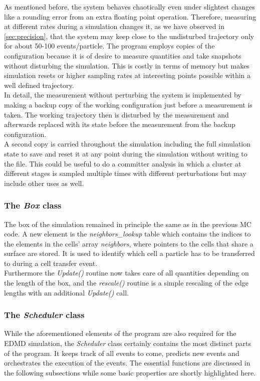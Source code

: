 As mentioned before, the system behaves chaotically even under slightest changes like a rounding error from an extra floating point operation. Therefore, measuring at different rates during a simulation changes it, as we have observed in \autoref{sec:precision}, that the system may keep close to the undisturbed trajectory only for about 50-100 events/particle. The program employs copies of the configuration because it is of desire to measure quantities and take snapshots without disturbing the simulation. This is costly in terms of memory but makes simulation resets or higher sampling rates at interesting points possible within a well defined trajectory.\\ 

In detail, the measurement without perturbing the system is implemented by making a backup copy of the working configuration just before a measurement is taken. The working trajectory then is disturbed by the measurement and afterwards replaced with its state before the measurement from the backup configuration.\\
A second copy is carried throughout the simulation including the full simulation state to save and reset it at any point during the simulation without writing to the file. This could be useful to do a committer analysis in which a cluster at different stages is sampled multiple times with different perturbations but may include other uses as well.

\subsubsection{The \textit{Box} class}
\label{sec:box_class}
The box of the simulation remained in principle the same as in the previous MC code. A new element is the \textit{neighbors\_lookup} table which contains the indices to the elements in the cells' array \textit{neighbors}, where pointers to the cells that share a surface are stored. It is used to identify which cell a particle has to be transferred to during a cell transfer event.\\

Furthermore the \textit{Update()} routine now takes care of all quantities depending on the length of the box, and the \textit{rescale()} routine is a simple rescaling of the edge lengths with an additional \textit{Update()} call.

\subsubsection{The \textit{Scheduler} class}
\label{sec:scheduler_class}
While the aforementioned elements of the program are also required for the EDMD simulation, the \textit{Scheduler} class certainly contains the most distinct parts of the program. It keeps track of all events to come, predicts new events and orchestrates the execution of the events. The essential functions are discussed in the following subsections while some basic properties are shortly highlighted here.\\

